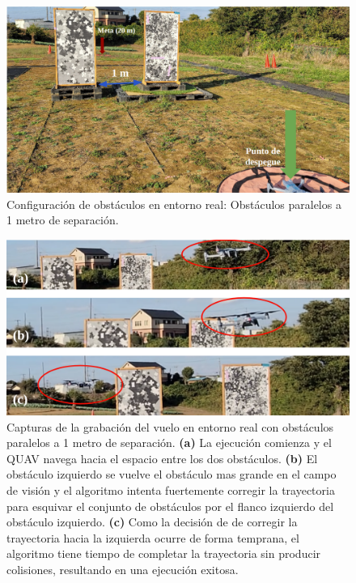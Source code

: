 \begin{figure}[H]
    \centering
    \includegraphics[scale=0.25]{partes/img/real-4-parallelC-0-config.png}
    \caption[Configuración de obstáculos en entorno real: Obstáculos paralelos a 1 metro de separación.]{Configuración de obstáculos en entorno real: Obstáculos paralelos a 1 metro de separación.}
    \label{real-4-parallelC-0-config}
\end{figure}

\begin{figure}[H]
    \centering
    \includegraphics[scale=0.24]{partes/img/real-4-parallelC-1-frames.png}
    \caption[Capturas de la grabación del vuelo en entorno real con obstáculos paralelos a 1 metro de separación.]{Capturas de la grabación del vuelo en entorno real con obstáculos paralelos a 1 metro de separación. \textbf{(a)} La ejecución comienza y el QUAV navega hacia el espacio entre los dos obstáculos. \textbf{(b)} El obstáculo izquierdo se vuelve el obstáculo mas grande en el campo de visión y el algoritmo intenta fuertemente corregir la trayectoria para esquivar el conjunto de obstáculos por el flanco izquierdo del obstáculo izquierdo. \textbf{(c)} Como la decisión de de corregir la trayectoria hacia la izquierda ocurre de forma temprana, el algoritmo tiene tiempo de completar la trayectoria sin producir colisiones, resultando en una ejecución exitosa. }
    \label{real-4-parallelC-1-frames}
\end{figure}

